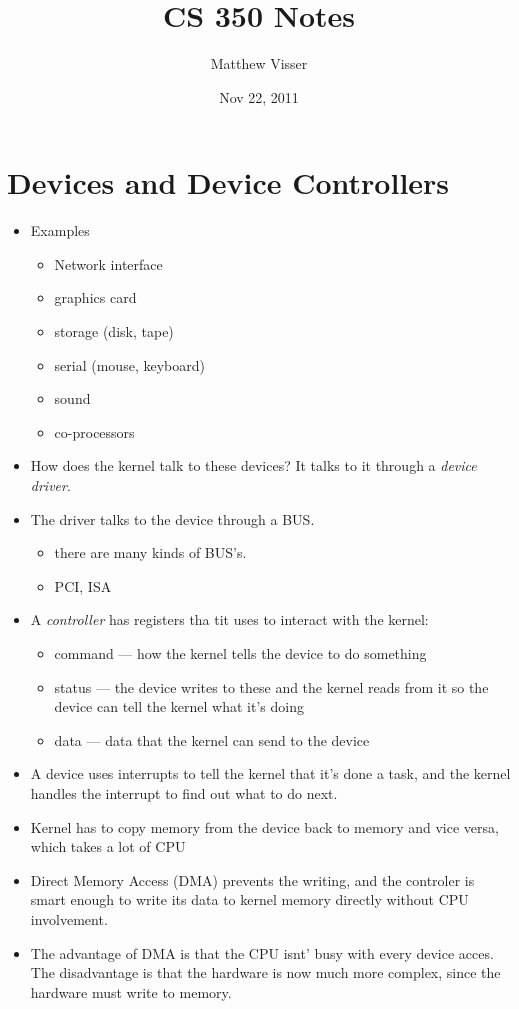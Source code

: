\documentclass[12pt]{article}
\begin{document}
\title{CS 350 Notes}
\author{Matthew Visser}
\date{Nov 22, 2011}
\maketitle

\section{Devices and Device Controllers}

\begin{itemize}
	\item Examples
		\begin{itemize}
			\item Network interface
			\item graphics card
			\item storage (disk, tape)
			\item serial (mouse, keyboard)
			\item sound
			\item co-processors
		\end{itemize}

	\item How does the kernel talk to these devices? It talks to it through a
		\emph{device driver}.

	\item The driver talks to the device through a BUS.
		\begin{itemize}
			\item there are many kinds of BUS's.
			\item PCI, ISA
		\end{itemize}
	\item A \emph{controller} has registers tha tit uses to interact with the
		kernel:
		\begin{itemize}
			\item command --- how the kernel tells the device to do something
			\item status --- the device writes to these and the kernel reads
				from it so the device can tell the kernel what it's doing
			\item data --- data that the kernel can send to the device
		\end{itemize}
	\item A device uses interrupts to tell the kernel that it's done a task, and
		the kernel handles the interrupt to find out what to do next.
	\item Kernel has to copy memory from the device back to memory and vice
		versa, which takes a lot of CPU
	\item Direct Memory Access (DMA) prevents the writing, and the controler is
		smart enough to write its data to kernel memory directly without CPU
		involvement.
	\item The advantage of DMA is that the CPU isnt' busy with every device
		acces. The disadvantage is that the hardware is now much more complex,
		since the hardware must write to memory.
\end{itemize}
\end{document}

